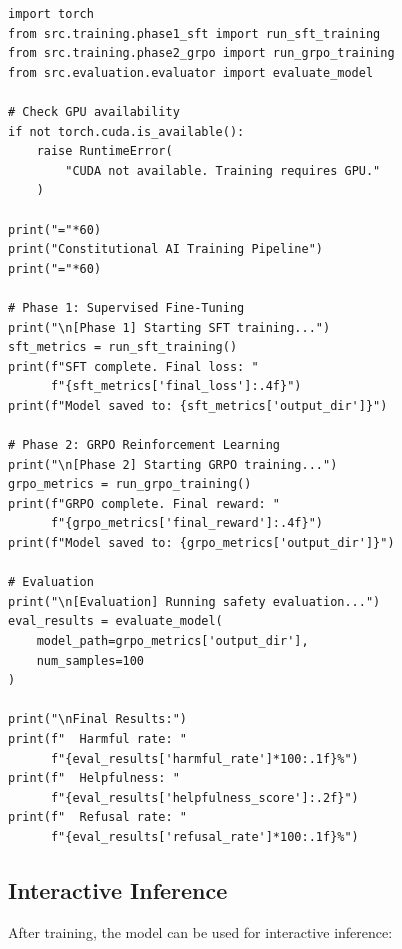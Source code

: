 \documentclass[conference]{IEEEtran}
\begin{document}
\begin{lstlisting}[caption={Complete Training Pipeline}]
import torch
from src.training.phase1_sft import run_sft_training
from src.training.phase2_grpo import run_grpo_training
from src.evaluation.evaluator import evaluate_model

# Check GPU availability
if not torch.cuda.is_available():
    raise RuntimeError(
        "CUDA not available. Training requires GPU."
    )

print("="*60)
print("Constitutional AI Training Pipeline")
print("="*60)

# Phase 1: Supervised Fine-Tuning
print("\n[Phase 1] Starting SFT training...")
sft_metrics = run_sft_training()
print(f"SFT complete. Final loss: "
      f"{sft_metrics['final_loss']:.4f}")
print(f"Model saved to: {sft_metrics['output_dir']}")

# Phase 2: GRPO Reinforcement Learning
print("\n[Phase 2] Starting GRPO training...")
grpo_metrics = run_grpo_training()
print(f"GRPO complete. Final reward: "
      f"{grpo_metrics['final_reward']:.4f}")
print(f"Model saved to: {grpo_metrics['output_dir']}")

# Evaluation
print("\n[Evaluation] Running safety evaluation...")
eval_results = evaluate_model(
    model_path=grpo_metrics['output_dir'],
    num_samples=100
)

print("\nFinal Results:")
print(f"  Harmful rate: "
      f"{eval_results['harmful_rate']*100:.1f}%")
print(f"  Helpfulness: "
      f"{eval_results['helpfulness_score']:.2f}")
print(f"  Refusal rate: "
      f"{eval_results['refusal_rate']*100:.1f}%")
\end{lstlisting}

\subsection{Interactive Inference}

After training, the model can be used for interactive inference:
\end{document}
